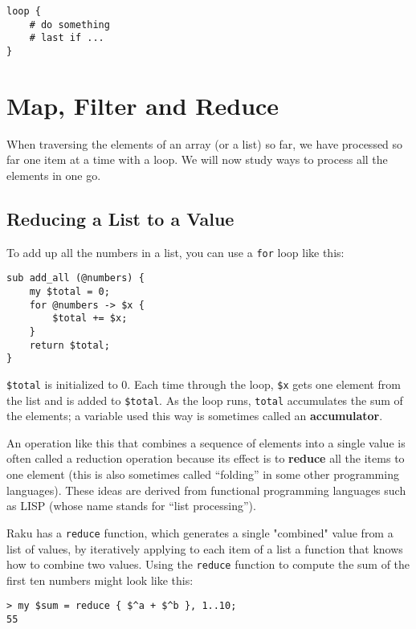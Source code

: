 \begin{verbatim}
loop {
    # do something 
    # last if ...
}
\end{verbatim}
%


\section{Map, Filter and Reduce}
\label{map_filter}

When traversing the elements of an array (or a list) so far, we have 
processed so far one item at a time with a loop. We will 
now study ways to process all the elements in one go.

\subsection{Reducing a List to a Value}

To add up all the numbers in a list, you can use a {\tt for} 
loop like this:


\begin{verbatim}
sub add_all (@numbers) {
    my $total = 0;
    for @numbers -> $x {
        $total += $x;
    }
    return $total;
}
\end{verbatim}
%
{\tt \$total} is initialized to 0.  Each time through the loop,
{\tt \$x} gets one element from the list and is added to 
{\tt \$total}. As the loop runs, {\tt total} accumulates the 
sum of the elements; a variable used this way is sometimes 
called an {\bf accumulator}.

An operation like this that combines a sequence of elements into
a single value is often called a reduction operation because 
its effect is to {\bf reduce} all the items to one element (this 
is also sometimes called ``folding'' in some other programming 
languages). These ideas are derived from functional 
programming languages such as LISP (whose name stands for ``list 
processing'').

Raku has a {\tt reduce} function, which generates a single 
"combined" value from a list of values, by iteratively applying 
to each item of a list a function that knows how to combine two values. 
Using the {\tt reduce} function to compute the sum of the 
first ten numbers might look like this:

\begin{verbatim}
> my $sum = reduce { $^a + $^b }, 1..10;
55
\end{verbatim}

